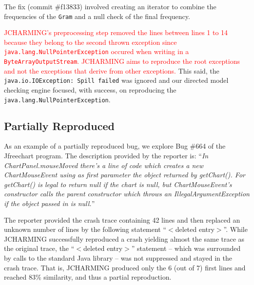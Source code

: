 \documentclass[times, doublespace]{smrauth}
\newcommand{\red}[1]{\textcolor{red}{#1}}
\begin{document}
The fix (commit \#f13833) involved creating an iterator to combine the frequencies of the {\tt Gram} and a null check of the final frequency.

\red{JCHARMING's preprocessing step
removed the lines between lines 1 to 14 because they
belong to the second thrown exception since {\tt java.lang.NullPointerException} occured when writing in a {\tt ByteArrayOutputStream}.
JCHARMING aims to reproduce the root exceptions and not the exceptions that derive from other exceptions.}
This said, the {\tt java.io.IOException: Spill failed} was ignored and our directed model checking engine focused, with success, on reproducing the {\tt java.lang.NullPointerException}.

\subsection{Partially Reproduced}

As an example of a partially reproduced bug, we explore Bug \#664 of the Jfreechart program. The description provided
by the reporter is: ``{\it In ChartPanel.mouseMoved there's a line
of code which creates a new ChartMouseEvent using as first
parameter the object returned by getChart(). For getChart() is
legal to return null if the chart is null, but ChartMouseEvent's
constructor calls the parent constructor which throws an
IllegalArgumentException if the object passed in is null.}''

The reporter provided the crash trace containing 42 lines and
then replaced an unknown number of lines by the following
statement ``$<$deleted entry$>$''. While JCHARMING successfully reproduced a crash yielding almost the same trace
as the original trace, the ``$<$deleted entry$>$'' statement -- which
was surrounded by calls to the standard Java library -- was not
suppressed and stayed in the crash trace. That is,
JCHARMING produced only the 6 (out of 7) first lines and
reached 83\% similarity, and thus a partial reproduction.

\vspace*{0.3cm}

\noindent{}
\end{document}

